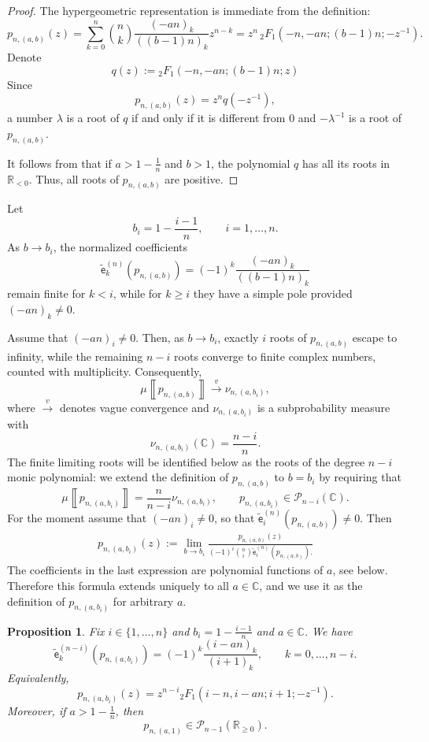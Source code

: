 \documentclass[a4paper,11pt]{amsart}
\numberwithin{equation}{section}
\newtheorem{proposition}[theorem]{Proposition}
\newcommand{\vague}{\xrightarrow{v}}
\newcommand{\C}{\mathbb{C}}
\newcommand{\R}{\mathbb{R}}
\newcommand{\pols}{\mathcal P}
\newcommand{\falling}[2]{\left(#1\right)_{#2}}
\newcommand{\meas}[1]{\mu\! \left\llbracket #1 \right\rrbracket}
\newcommand{\coef}[2]{\widetilde{\mathsf{e}}_{#1}^{(#2)}} %
\begin{document}
\begin{proof}
The hypergeometric representation is immediate from the definition:
\[
p_{n,(a,b)}(z)
=\sum_{k=0}^n \binom{n}{k}\frac{(-an)_k}{((b-1)n)_k}z^{n-k}
= z^n\,{}_2F_1\!\left(-n,-an;(b-1)n;-z^{-1}\right).
\]
Denote 
\[
q(z):={}_2F_1(-n,-an;(b-1)n;z)
\]
Since
\[
p_{n,(a,b)}(z)=z^n q(-z^{-1}),
\]
a number $\lambda$ is a root of $q$ if and only if it is different from $0$ and $-\lambda^{-1}$ is a root of $p_{n,(a,b)}$.

It follows from \cite[Theorem 1(i)]{RealZeros} that if $a>1-\frac1n$ and $b>1$, the polynomial $q$ has all its roots in $\R_{<0}$.  Thus, all roots of $p_{n,(a,b)}$ are positive.
\end{proof}

Let
\[
b_i = 1-\frac{i-1}{n},\qquad i=1,\ldots,n.
\]
As \(b\to b_i\), the normalized coefficients
\[
\coef{k}{n}(p_{n,(a,b)})
=
(-1)^k\frac{(-an)_k}{((b-1)n)_k}
\]
remain finite for \(k<i\), while for \(k\ge i\) they have a simple pole provided \((-an)_k\neq 0\). 

Assume that \((-an)_i\neq0\). Then, as \(b\to b_i\), exactly \(i\) roots of
\(p_{n,(a,b)}\) escape to infinity, while the remaining \(n-i\) roots converge
to finite complex numbers, counted with multiplicity. Consequently,
\[
\meas{p_{n,(a,b)}} \vague \nu_{n,(a,b_i)},
\]
where \(\vague\) denotes vague convergence and
\(\nu_{n,(a,b_i)}\) is a subprobability measure with
\[
\nu_{n,(a,b_i)}(\C)=\frac{n-i}{n}.
\]
The finite limiting roots will be identified below as the roots of the 
degree \(n-i\) monic polynomial: we extend the definition of \(p_{n,(a,b)}\) to \(b=b_i\) by requiring that
\[
\meas{p_{n,(a,b_i)}}=\frac{n}{n-i}\nu_{n,(a,b_i)},
\qquad
p_{n,(a,b_i)}\in\pols_{n-i}(\C).
\]
For the moment assume that $(-an)_i\neq 0$,
so that $\coef{i}{n}(p_{n,(a,b)})\neq 0$. Then
\begin{align}\label{eq:defb=1}
p_{n,(a,b_i)}(z):=
\lim_{b\to b_i}
\frac{
p_{n,(a,b)}(z)
}{
(-1)^i\binom{n}{i}\coef{i}{n}(p_{n,(a,b)}).
}
\end{align}
The coefficients in the last expression are polynomial functions of \(a\), see below.
Therefore this formula extends uniquely to all \(a\in\C\), and we use it as
the definition of \(p_{n,(a,b_i)}\) for arbitrary \(a\).
\begin{proposition}\label{prop:b_i}
Fix $i\in\{1,\ldots,n\}$ and $b_i=1-\frac{i-1}{n}$ and \(a\in\C\). We have
\[
\coef{k}{n-i}(p_{n,(a,b_i)})
= (-1)^k
\frac{\falling{i-an}{k}}{(i+1)_k},\qquad k=0,\ldots,n-i.
\]
Equivalently,
\[
p_{n,(a,b_i)}(z)
=
z^{n-i}{}_2F_1(i-n,i-an;i+1;-z^{-1}).
\]
Moreover, if \(a>1-\frac1n\), then
\[
p_{n,(a,1)}\in\pols_{n-1}(\R_{\ge0}).
\]
\end{proposition}
\end{document}
